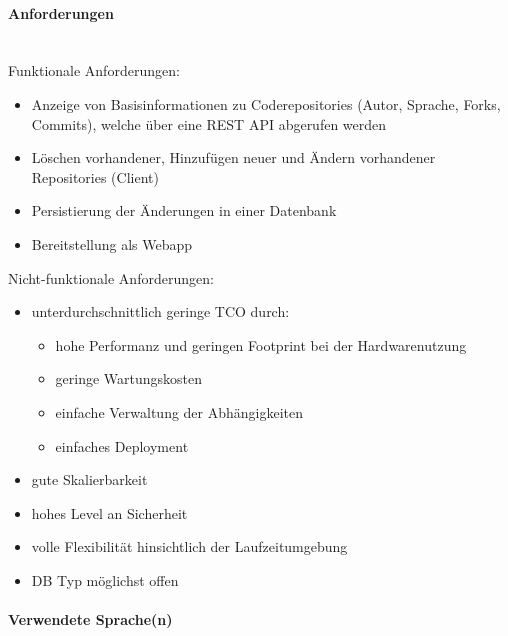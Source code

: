 \documentclass[notitlepage, hidelinks]{article}
\begin{document}
\paragraph{Anforderungen} \mbox{} \\

Funktionale Anforderungen:
\begin{itemize}
\item Anzeige von Basisinformationen zu Coderepositories (Autor, Sprache, Forks, Commits), welche über eine REST API abgerufen werden
\item Löschen vorhandener, Hinzufügen neuer und Ändern vorhandener Repositories (Client)
\item Persistierung der Änderungen in einer Datenbank
\item Bereitstellung als Webapp
\end{itemize}

Nicht-funktionale Anforderungen: 
\begin{itemize}
\item unterdurchschnittlich geringe TCO durch:
\begin{itemize}
\item hohe Performanz und geringen Footprint bei der Hardwarenutzung
\item geringe Wartungskosten
\item einfache Verwaltung der Abhängigkeiten
\item einfaches Deployment
\end{itemize}
\item gute Skalierbarkeit
\item hohes Level an Sicherheit
\item volle Flexibilität hinsichtlich der Laufzeitumgebung
\item DB Typ möglichst offen
\end{itemize}



\paragraph{Verwendete Sprache(n)} \mbox{} \\
\end{document}
